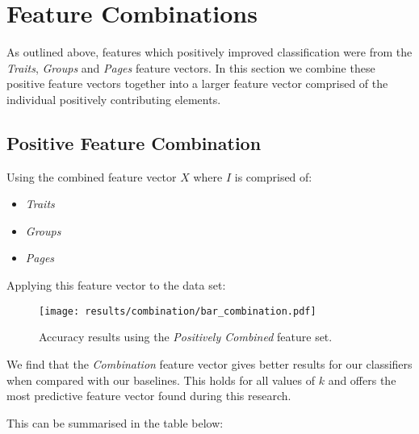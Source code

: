 
\chapter{Feature Combinations}
\label{cha:bma}

As outlined above, features which positively improved classification were from the \emph{Traits}, \emph{Groups} and \emph{Pages} feature 
vectors. In this section we combine these positive feature vectors together into a larger feature vector comprised of the individual 
positively contributing elements.

\section{Positive Feature Combination}
\label{sec:notation}

Using the combined feature vector $X$ where $I$ is comprised of:
\begin{itemize}
\item \emph{Traits}
\item \emph{Groups}
\item \emph{Pages}
\end{itemize}

\clearpage

Applying this feature vector to the data set:

\begin{figure}[h]
	\begin{center}
		\texttt{[image: results/combination/bar\_combination.pdf]}
		\caption{Accuracy results using the \emph{Positively Combined} feature set.}
	\end{center}
\end{figure}

\clearpage

We find that the \emph{Combination} feature vector gives better results for our classifiers when compared with our baselines. This 
holds for all values of $k$ and offers the most predictive feature vector found during this research.

This can be summarised in the table below:

